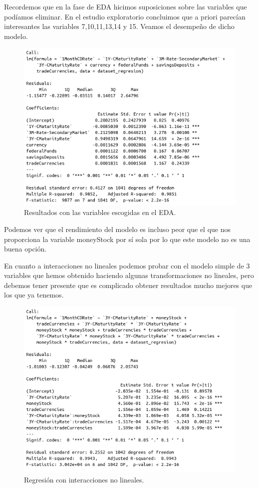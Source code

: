 \documentclass[12pt,a4paper]{article}
\begin{document}
Recordemos que en la fase de EDA hicimos suposiciones sobre las variables que podíamos eliminar. En el estudio exploratorio concluimos que a priori parecían interesantes las variables 7,10,11,13,14 y 15. Veamos el desempeño de dicho modelo.

\begin{figure}[H]
	\centering 
	\includegraphics[scale=0.6]{./Imagenes/Regresion/regresion_multiple14.png}
	\caption{Resultados con las variables escogidas en el EDA.}
\end{figure}

Podemos ver que el rendimiento del modelo es incluso peor que el que nos proporciona la variable moneyStock por sí sola por lo que este modelo no es una buena opción.

En cuanto a interacciones no lineales podemos probar con el modelo simple de 3 variables que hemos obtenido haciendo algunas transformaciones no lineales, pero debemos tener presente que es complicado obtener resultados mucho mejores que los que ya tenemos.

\begin{figure}[H]
	\centering 
	\includegraphics[scale=0.6]{./Imagenes/Regresion/regresion_multiple15.png}
	\caption{Regresión con interacciones no lineales.}
\end{figure}
\end{document}

